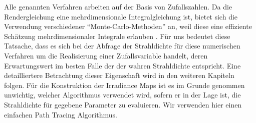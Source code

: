 		Alle genannten Verfahren arbeiten auf der Basis von Zufallszahlen.
		Da die Rendergleichung eine mehrdimensionale Integralgleichung ist, bietet sich die Verwendung verschiedener \enquote{Monte-Carlo-Methoden} an, weil diese eine effiziente Schätzung mehrdimensionaler Integrale erlauben \cite{monte-carlo-method}.
		Für uns bedeutet diese Tatsache, dass es sich bei der Abfrage der Strahldichte für diese numerischen Verfahren um die Realisierung einer Zufallsvariable handelt, deren Erwartungswert im besten Falle der der wahren Strahldichte entspricht.
		Eine detailliertere Betrachtung dieser Eigenschaft wird in den weiteren Kapiteln folgen.
		Für die Konstruktion der Irradiance Maps ist es im Grunde genommen unwichtig, welcher Algorithmus verwendet wird, sofern er in der Lage ist, die Strahldichte für gegebene Parameter zu evaluieren.
		Wir verwenden hier einen einfachen Path Tracing Algorithmus.


